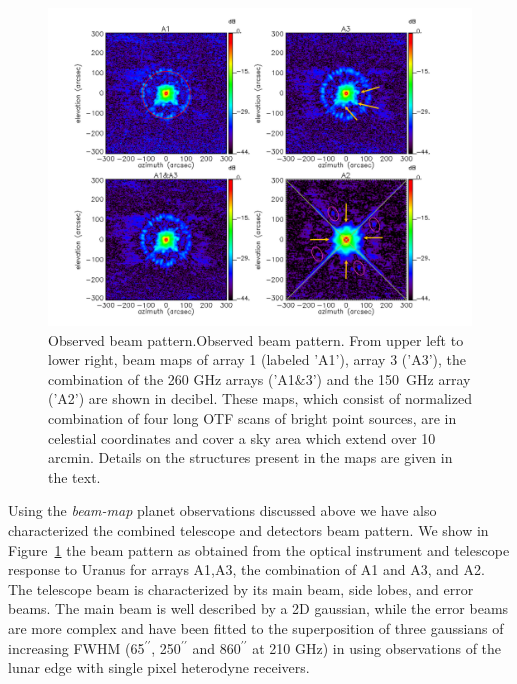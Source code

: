 \documentclass[]{aa} %
\begin{document}
\begin{figure}[h]
   \centering
    \includegraphics[width=0.9\linewidth]{Beams_features.pdf}
     
      \caption{Observed beam pattern.Observed beam pattern. From upper left to lower right,
        beam maps of array 1 (labeled 'A1'), array 3 ('A3'), the
        combination of the 260 GHz arrays ('A1$\&$3') and the 150~GHz array
        ('A2') are shown in decibel. These maps, which consist of
        normalized combination of four long OTF scans of bright point
        sources, are in celestial coordinates and cover a sky area
        which extend over 10 arcmin. Details on the structures present in the maps are given in the text.}
         \label{fig:beampattern}
\end{figure}

Using the {\it beam-map} planet observations discussed above we have also characterized the combined telescope and detectors beam pattern. We show in Figure~\ref{fig:beampattern} the beam pattern as obtained from the optical instrument and telescope response to Uranus for arrays A1,A3, the combination of A1 and A3, and A2. The telescope beam is characterized by its main beam, side lobes, and error beams. The main beam is well described by a 2D gaussian, while the error beams are more complex and have been fitted to the superposition of three gaussians of increasing FWHM (65$^{\prime \prime}$, 250$^{\prime \prime}$ and 860$^{\prime \prime}$ at 210 GHz) in \cite{greeve1998,kramer2013} using observations of the lunar edge with single pixel heterodyne receivers.
\end{document}
